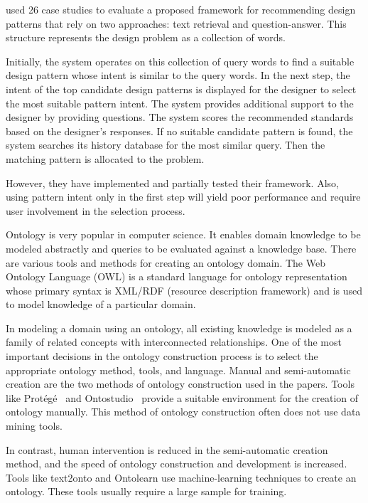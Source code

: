 \textcite{Suresh2011} used 26 case studies to evaluate a proposed framework for recommending design patterns that rely on two approaches: text retrieval and question-answer. This structure represents the design problem as a collection of words.

Initially, the system operates on this collection of query words to find a suitable design pattern whose intent is similar to the query words. In the next step, the intent of the top candidate design patterns is displayed for the designer to select the most suitable pattern intent. The system provides additional support to the designer by providing questions. The system scores the recommended standards based on the designer's responses. If no suitable candidate pattern is found, the system searches its history database for the most similar query. Then the matching pattern is allocated to the problem.

However, they have implemented and partially tested their framework. Also, using pattern intent only in the first step will yield poor performance and require user involvement in the selection process.

\label{subsec:ontology-approach}

Ontology is very popular in computer science. It enables domain knowledge to be modeled abstractly and queries to be evaluated against a knowledge base. There are various tools and methods for creating an ontology domain. The Web Ontology Language (OWL) is a standard language for ontology representation whose primary syntax is XML/RDF (resource description framework) and is used to model knowledge of a particular domain. 

In modeling a domain using an ontology, all existing knowledge is modeled as a family of related concepts with interconnected relationships. One of the most important decisions in the ontology construction process is to select the appropriate ontology method, tools, and language. Manual and semi-automatic creation are the two methods of ontology construction used in the papers. Tools like Protégé~\textcite{Gennari2003} and Ontostudio~\textcite{Weiten2009} provide a suitable environment for the creation of ontology manually. This method of ontology construction often does not use data mining tools.

In contrast, human intervention is reduced in the semi-automatic creation method, and the speed of ontology construction and development is increased. Tools like text2onto \textcite{Cimiano2005} and Ontolearn \textcite{Velardi2013} use machine-learning techniques to create an ontology. These tools usually require a large sample for training. 

